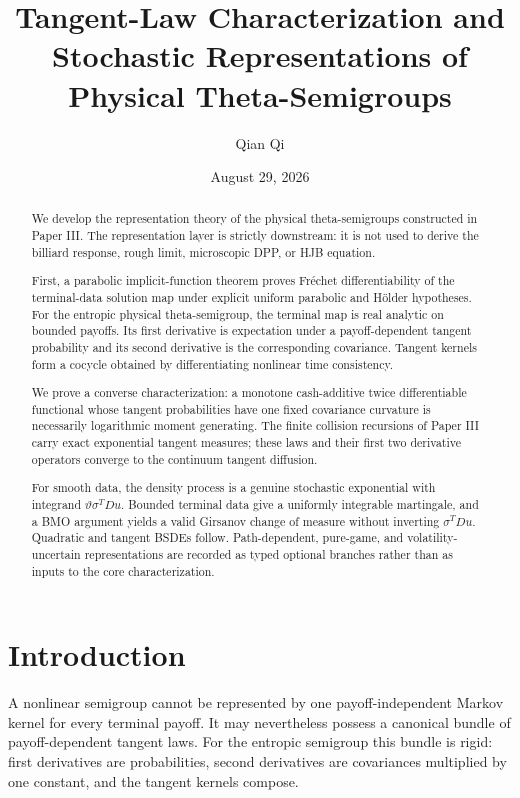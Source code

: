 \documentclass[11pt,reqno]{amsart}
\title[Tangent laws and representations]{Tangent-Law Characterization and Stochastic Representations of Physical Theta-Semigroups}
\author{Qian Qi}
\date{August 29, 2026}
\theoremstyle{definition}
\theoremstyle{remark}
\begin{document}
\begin{abstract}
We develop the representation theory of the physical theta-semigroups
constructed in Paper III.  The representation layer is strictly downstream:
it is not used to derive the billiard response, rough limit, microscopic DPP,
or HJB equation.

First, a parabolic implicit-function theorem proves Fr\'echet differentiability
of the terminal-data solution map under explicit uniform parabolic and
H\"older hypotheses.  For the entropic physical theta-semigroup, the terminal
map is real analytic on bounded payoffs.  Its first derivative is expectation
under a payoff-dependent tangent probability and its second derivative is the
corresponding covariance.  Tangent kernels form a cocycle obtained by
differentiating nonlinear time consistency.

We prove a converse characterization: a monotone cash-additive twice
differentiable functional whose tangent probabilities have one fixed
covariance curvature is necessarily logarithmic moment generating.  The
finite collision recursions of Paper III carry exact exponential tangent
measures; these laws and their first two derivative operators converge to the
continuum tangent diffusion.

For smooth data, the density process is a genuine stochastic exponential with
integrand $\vartheta\sigma^TDu$.  Bounded terminal data give a uniformly
integrable martingale, and a BMO argument yields a valid Girsanov change of
measure without inverting $\sigma^TDu$.  Quadratic and tangent BSDEs follow.
Path-dependent, pure-game, and volatility-uncertain representations are
recorded as typed optional branches rather than as inputs to the core
characterization.
\end{abstract}

\maketitle
\tableofcontents

\section{Introduction}

A nonlinear semigroup cannot be represented by one payoff-independent Markov
kernel for every terminal payoff.  It may nevertheless possess a canonical
bundle of payoff-dependent tangent laws.  For the entropic semigroup this
bundle is rigid: first derivatives are probabilities, second derivatives are
covariances multiplied by one constant, and the tangent kernels compose.
\end{document}
